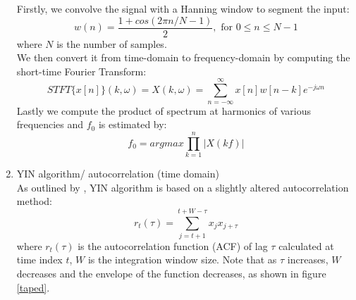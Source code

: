 \begin{enumerate}
    Firstly, we convolve the signal with a Hanning window to segment the input:
    \[w(n) = \frac{1+cos(2\pi n/N-1)}{2}, \text{ for } 0 \leq n \leq N-1\] where $N$ is the number of samples.\\
    We then convert it from time-domain to frequency-domain by computing the short-time Fourier Transform:
    \[STFT \{x[n]\}(k,\omega) = X(k,\omega )= \sum _{n=-\infty }^{\infty }x[n]w[n-k]e^{-j\omega n}\]
    Lastly we compute the product of spectrum at harmonics of various frequencies and $f_0$ is estimated by:
    \[f_0 = argmax\prod_{k=1}^{n}|X(kf)|\] 

    \item YIN algorithm/ autocorrelation (time domain)\\
    As outlined by \cite{yin}, YIN algorithm is based on a slightly altered autocorrelation method:
    \[r_t(\tau)=\sum_{j=t+1}^{t+W-\tau}x_j x_{j+\tau}\]
    where $r_t(\tau)$ is the autocorrelation function (ACF) of lag $\tau$ calculated at time index $t$, $W$ is the integration
    window size. Note that as $\tau$ increases, $W$ decreases and the envelope of the function decreases, as shown in figure 
    \ref{taped}.


\end{enumerate}
